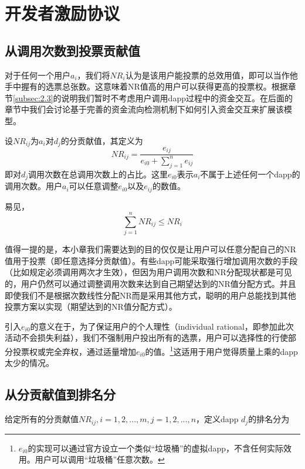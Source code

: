 \section{开发者激励协议}
\subsection{从调用次数到投票贡献值}
对于任何一个用户$a_i$，我们将$NR_i$认为是该用户能投票的总效用值，即可以当作他手中握有的选票总张数。这意味着NR值高的用户可以获得更高的投票权。根据章节\ref{subsec:2.3}的说明我们暂时不考虑用户调用dapp过程中的资金交互。在后面的章节中我们会讨论基于完善的资金流向检测机制下如何引入资金交互来扩展该模型。

设$NR_{ij}$为$a_i$对$d_j$的分贡献值，其定义为
$$  NR_{ij} = \frac{e_{ij}}{e_{i0}+\sum_{j=1}^n {e_{ij}}}$$
即对$d_j$调用次数在总调用次数上的占比。这里$e_{i0}$表示$a_i$不属于上述任何一个dapp的调用次数。用户$a_i$可以任意调整$e_{i0}$以及$e_{ij}$的数值。

易见，
$$\sum_{j=1}^n NR_{ij} \leq NR_i$$

值得一提的是，本小章我们需要达到的目的仅仅是让用户可以任意分配自己的NR值用于投票（即任意选择分贡献值）。有些dapp可能采取强行增加调用次数的手段（比如规定必须调用两次才生效），但因为用户调用次数和NR分配现状都是可见的，用户仍然可以通过调整调用次数来达到自己期望达到的NR值分配方式。并且即使我们不是根据次数线性分配NR而是采用其他方式，聪明的用户总能找到其他投票方案以实现（期望达到的NR值分配方式）。

引入$e_{i0}$的意义在于，为了保证用户的个人理性（individual rational，即参加此次活动不会损失利益），我们不强制用户投出所有的选票，用户可以选择性的行使部分投票权或完全弃权，通过适量增加$e_{i0}$的值。\footnote{$e_{i0}$的实现可以通过官方设立一个类似“垃圾桶”的虚拟dapp，不含任何实际效用。用户可以调用“垃圾桶”任意次数。}这适用于用户觉得质量上乘的dapp太少的情况。


\subsection{从分贡献值到排名分}
给定所有的分贡献值$NR_{ij}, i=1,2,...,m,j=1,2,...,n$，定义dapp $d_j$的排名分为

